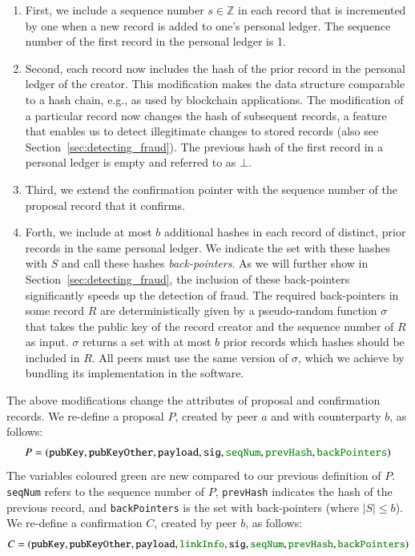 \begin{enumerate}
	\item First, we include a sequence number $ s \in \mathbb{Z} $ in each record that is incremented by one when a new record is added to one's personal ledger.
	The sequence number of the first record in the personal ledger is 1.
	\item Second, each record now includes the hash of the prior record in the personal ledger of the creator.
	This modification makes the \TrustChain{} data structure comparable to a hash chain, e.g., as used by blockchain applications.
	The modification of a particular record now changes the hash of subsequent records, a feature that enables us to detect illegitimate changes to stored records (also see Section~\ref{sec:detecting_fraud}).
	The previous hash of the first record in a personal ledger is empty and referred to as $ \bot $.
	\item Third, we extend the confirmation pointer with the sequence number of the proposal record that it confirms.
	\item Forth, we include at most $ b $ additional hashes in each record of distinct, prior records in the same personal ledger.
	We indicate the set with these hashes with $ S $ and call these hashes \emph{back-pointers}.
	As we will further show in Section~\ref{sec:detecting_fraud}, the inclusion of these back-pointers significantly speeds up the detection of fraud.
	The required back-pointers in some record $ R $ are deterministically given by a pseudo-random function $ \sigma $ that takes the public key of the record creator and the sequence number of $ R $ as input.
	$ \sigma $ returns a set with at most $ b $ prior records which hashes should be included in $ R $.
	All peers must use the same version of $ \sigma $, which we achieve by bundling its implementation in the \TrustChain{} software.
\end{enumerate}

The above modifications change the attributes of proposal and confirmation records.
We re-define a proposal $ P $, created by peer $ a $ and with counterparty $ b $, as follows:
\begin{align*}
	P = (\texttt{pubKey}, \texttt{pubKeyOther}, \texttt{payload}, \texttt{sig}, \textcolor{ao}{\texttt{seqNum}}, \textcolor{ao}{\texttt{prevHash}}, \textcolor{ao}{\texttt{backPointers}})
\end{align*}
The variables coloured green are new compared to our previous definition of $ P $.
\texttt{seqNum} refers to the sequence number of $ P $, \texttt{prevHash} indicates the hash of the previous record, and \texttt{backPointers} is the set with back-pointers (where $ |S| \leq b $).
We re-define a confirmation $ C $, created by peer $ b $, as follows:
\begin{align*}
	C = (\texttt{pubKey}, \texttt{pubKeyOther}, \texttt{payload}, \textcolor{ao}{\texttt{linkInfo}}, \texttt{sig},
	\textcolor{ao}{\texttt{seqNum}}, \textcolor{ao}{\texttt{prevHash}}, \textcolor{ao}{\texttt{backPointers}})
\end{align*}

